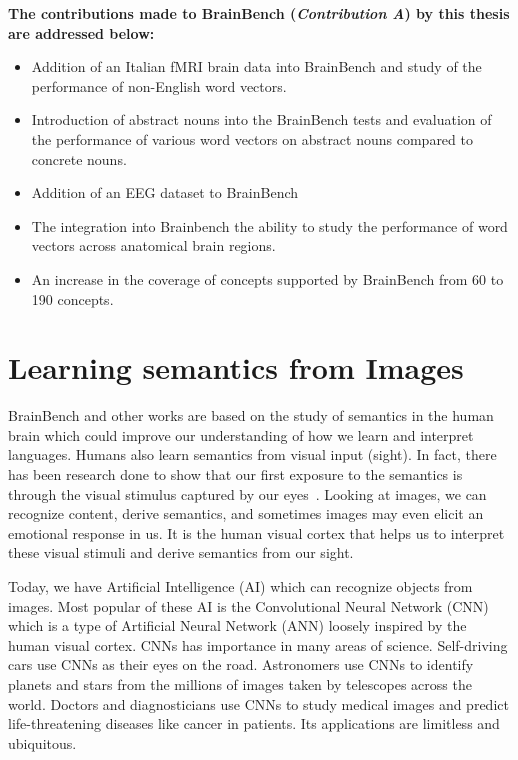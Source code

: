 \noindent \textbf{The contributions made to BrainBench (\textit{Contribution A}) by this thesis are addressed below:}

\begin{itemize}

\item{Addition of an Italian fMRI brain data into BrainBench and study of the performance of non-English word vectors.}

\item {Introduction of abstract nouns into the BrainBench tests and evaluation of the performance of various word vectors on abstract nouns compared to concrete nouns.}

\item {Addition of an EEG dataset to BrainBench}

\item {The integration into Brainbench the ability to study the performance of word vectors across anatomical brain regions.}

\item{ An increase in the coverage of concepts supported by BrainBench from 60 to 190 concepts}.
\end{itemize}

\section{Learning semantics from Images}
BrainBench and other works are based on the study of semantics in the human brain which could improve our understanding of how we learn and interpret languages. Humans also learn semantics from visual input (sight). In fact, there has been research done to show that our first exposure to the semantics is through the visual stimulus captured by our eyes~\cite{norton2007through}. Looking at images, we can recognize content, derive semantics, and sometimes images may even elicit an emotional response in us. It is the human visual cortex that helps us to interpret these visual stimuli and derive semantics from our sight.  

Today, we have Artificial Intelligence (AI) which can recognize objects from images. Most popular of these AI is the Convolutional Neural Network (CNN) which is a type of Artificial Neural Network (ANN) loosely inspired by the human visual cortex. CNNs has importance in many areas of science. Self-driving cars use CNNs as their eyes on the road. Astronomers use CNNs to identify planets and stars from the millions of images taken by telescopes across the world. Doctors and diagnosticians use CNNs to study medical images and predict life-threatening diseases like cancer in patients. Its applications are limitless and ubiquitous. 

